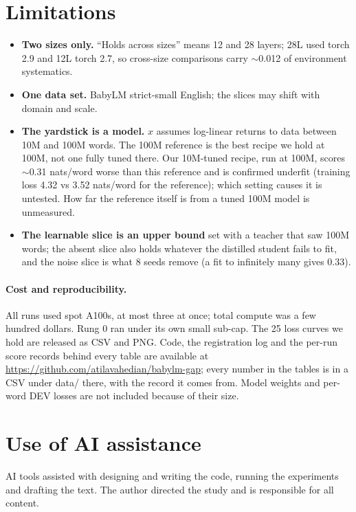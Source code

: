 \documentclass[11pt]{article}
\newcommand{\releaseurl}{\url{https://github.com/atilavahedian/babylm-gap}}
\begin{document}
\section{Limitations}
\begin{itemize}
\item \textbf{Two sizes only.} ``Holds across sizes'' means 12 and 28 layers; 28L used torch 2.9 and 12L torch 2.7,
  so cross-size comparisons carry $\sim$0.012 of environment systematics.
\item \textbf{One data set.} BabyLM strict-small English; the slices may shift with domain and scale.
\item \textbf{The yardstick is a model.} $x$ assumes log-linear returns to data between 10M and 100M words. The 100M
  reference is the best recipe we hold at 100M, not one fully tuned there. Our 10M-tuned recipe, run at 100M, scores
  $\sim$0.31 nats/word worse than this reference and is confirmed underfit (training loss 4.32 vs 3.52 nats/word for
  the reference); which setting causes it is untested. How far the reference itself is from a tuned 100M model is
  unmeasured.
\item \textbf{The learnable slice is an upper bound} set with a teacher that saw 100M words; the absent slice also holds
  whatever the distilled student fails to fit, and the noise slice is what 8 seeds remove (a fit to infinitely many
  gives 0.33).
\end{itemize}

\paragraph{Cost and reproducibility.} All runs used spot A100s, at most three at once; total compute was a few hundred
dollars. Rung 0 ran under its own small sub-cap. The 25 loss curves we hold are released as CSV and PNG. Code, the
registration log and the per-run score records behind every table are available at \releaseurl; every number in the tables is in a CSV
under data/ there, with the record it comes from. Model weights and per-word DEV losses are not included because of
their size.

\section*{Use of AI assistance}
AI tools assisted with designing and writing the code, running the experiments and drafting the text. The author directed
the study and is responsible for all content.


\end{document}
